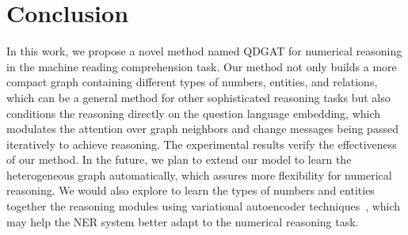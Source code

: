 \documentclass{article}
\begin{document}
\section{Conclusion}
In this work, we propose a novel method named QDGAT for numerical reasoning in the machine reading comprehension task.
Our method not only builds a more compact graph containing different types of numbers, entities, and relations, which can be a general method for other sophisticated reasoning tasks but also conditions the reasoning directly on the question language embedding, which modulates the attention over graph neighbors and change messages being passed iteratively to achieve reasoning.
The experimental results verify the effectiveness of our method. 
In the future, we plan to extend our model to learn the heterogeneous graph automatically, which assures more flexibility for numerical reasoning. We would also explore to learn the types of numbers and entities together the reasoning modules using variational autoencoder techniques~\cite{DBLP:journals/corr/KingmaW13}, which may help the NER system better adapt to the numerical reasoning task.
















\appendix
\end{document}
